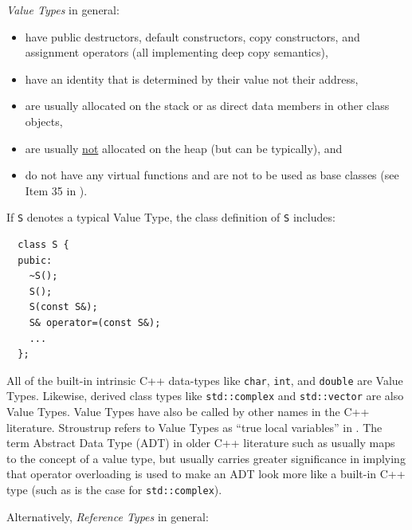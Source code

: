 \documentclass[pdf,ps2pdf,11pt]{SANDreport}
\begin{document}
{}\textit{Value Types} in general:

\begin{itemize}

{}\item have public destructors, default constructors, copy
constructors, and assignment operators (all implementing deep copy
semantics),

{}\item have an identity that is determined by their value not their
address,

{}\item are usually allocated on the stack or as direct data members
in other class objects,

{}\item are usually {}\underline{not} allocated on the heap (but can
be typically), and

{}\item do not have any virtual functions and are not to be used as
base classes (see Item 35 in {}\cite{C++CodingStandards05}).

\end{itemize}

If {}\texttt{S} denotes a typical Value Type, the class definition of
{}\texttt{S} includes:

{\small\begin{verbatim}
  class S {
  pubic:
    ~S();
    S();
    S(const S&);
    S& operator=(const S&);
    ...
  };
\end{verbatim}}

All of the built-in intrinsic C++ data-types like {}\texttt{char},
{}\texttt{int}, and {}\texttt{double} are Value Types.  Likewise,
derived class types like {}\texttt{std::complex} and
{}\texttt{std::vector} are also Value Types.  Value Types have also be
called by other names in the C++ literature.  Stroustrup refers to
Value Types as ``true local variables'' in {}\cite{stroustrup94}.  The
term Abstract Data Type (ADT) in older C++ literature such as
{}\cite{AdvancedC++92} usually maps to the concept of a value type,
but usually carries greater significance in implying that operator
overloading is used to make an ADT look more like a built-in C++ type
(such as is the case for {}\texttt{std::complex}).

Alternatively, {}\textit{Reference Types} in general:
\end{document}

